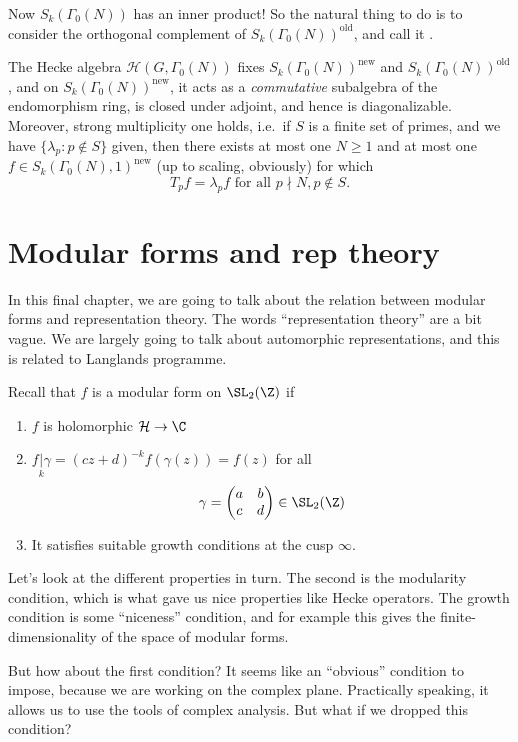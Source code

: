 \documentclass[a4paper]{article}
\renewcommand{\H}{\mathcal{H}}
\begin{document}
Now $S_k(\Gamma_0(N))$ has an inner product! So the natural thing to do is to consider the orthogonal complement of $S_k(\Gamma_0(N))^{\mathrm{old}}$, and call it .

\begin{thm}
  The Hecke algebra $\mathcal{H}(G, \Gamma_0(N))$ fixes $S_k(\Gamma_0(N))^{\mathrm{new}}$ and $S_k(\Gamma_0(N))^{\mathrm{old}}$, and on $S_k(\Gamma_0(N))^{\mathrm{new}}$, it acts as a \emph{commutative} subalgebra of the endomorphism ring, is closed under adjoint, and hence is diagonalizable. Moreover, strong multiplicity one holds, i.e.\ if $S$ is a finite set of primes, and we have $\{\lambda_p: p \not\in S\}$ given, then there exists at most one $N \geq 1$ and at most one $f \in S_k(\Gamma_0(N), 1)^{\mathrm{new}}$ (up to scaling, obviously) for which
  \[
    T_p f = \lambda_p f\text{ for all }p \nmid N, p \not \in S.
  \]
\end{thm}

\section{Modular forms and rep theory}
In this final chapter, we are going to talk about the relation between modular forms and representation theory. The words ``representation theory'' are a bit vague. We are largely going to talk about automorphic representations, and this is related to Langlands programme.

Recall that $f$ is a modular form on $\SL_2(\Z)$ if
\begin{enumerate}
  \item $f$ is holomorphic $\H \to \C$
  \item $f\underset{k}{|} \gamma = (cz + d)^{-k} f(\gamma(z)) = f(z)$ for all
    \[
      \gamma =
      \begin{pmatrix}
        a & b\\
        c & d
      \end{pmatrix} \in \SL_2(\Z)
    \]
  \item It satisfies suitable growth conditions at the cusp $\infty$.
\end{enumerate}
Let's look at the different properties in turn. The second is the modularity condition, which is what gave us nice properties like Hecke operators. The growth condition is some ``niceness'' condition, and for example this gives the finite-dimensionality of the space of modular forms.

But how about the first condition? It seems like an ``obvious'' condition to impose, because we are working on the complex plane. Practically speaking, it allows us to use the tools of complex analysis. But what if we dropped this condition?
\end{document}

